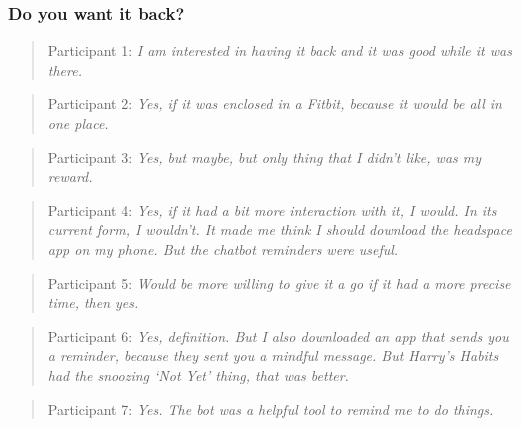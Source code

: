 \subsubsection*{Do you want it back?}
\begin{quote}
Participant 1: \textit{I am interested in having it back and it was good while it was there.}
\end{quote}
\begin{quote}
Participant 2: \textit{Yes, if it was enclosed in a Fitbit, because it would be all in one place.}
\end{quote}
\begin{quote}
Participant 3: \textit{Yes, but maybe, but only thing that I didn't like, was my reward.}
\end{quote}
\begin{quote}
Participant 4: \textit{Yes, if it had a bit more interaction with it, I would. In its current form, I wouldn't. It made me think I should download the headspace app on my phone. But the chatbot reminders were useful.}
\end{quote}
\begin{quote}
Participant 5: \textit{Would be more willing to give it a go if it had a more precise time, then yes.}
\end{quote}
\begin{quote}
Participant 6: \textit{Yes, definition. But I also downloaded an app that sends you a reminder, because they sent you a mindful message. But Harry's Habits had the snoozing `Not Yet' thing, that was better.}
\end{quote}
\begin{quote}
Participant 7: \textit{Yes. The bot was a helpful tool to remind me to do things.}
\end{quote}

